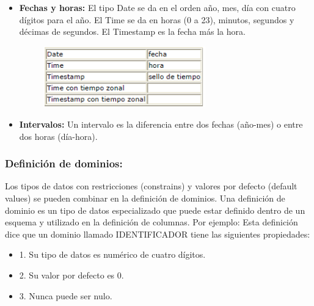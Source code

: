 \documentclass[preprint,12pt]{elsarticle}
\begin{document}
\begin{itemize}
	\item \textbf{Fechas y horas:} El tipo Date se da en el orden año, mes, día con cuatro dígitos para el año. El Time se da en horas (0 a 23), minutos, segundos y décimas de segundos. El Timestamp es la fecha más la hora.\\
	\begin{figure}[htb]
		\begin{center}
			\includegraphics[width=7cm]{./IMAGENES/fechas}
		\end{center}
	\end{figure}
	
	
	\item \textbf{Intervalos:} Un intervalo es la diferencia entre dos fechas (año-mes) o entre dos horas (día-hora).\\
	
\end{itemize}


\subsubsection{\textbf{Definición de dominios:}}	
Los tipos de datos con restricciones (constrains) y valores por defecto (default values) se pueden combinar en la definición de dominios. Una definición de dominio es un tipo de datos especializado que puede estar definido dentro de un esquema y utilizado en la definición de columnas. Por ejemplo:
Esta definición dice que un dominio llamado IDENTIFICADOR tiene las siguientes propiedades:
\begin{itemize}
\item 1. Su tipo de datos es numérico de cuatro dígitos.
\item 2. Su valor por defecto es 0.
\item 3. Nunca puede ser nulo.
\end{itemize}
\end{document}
